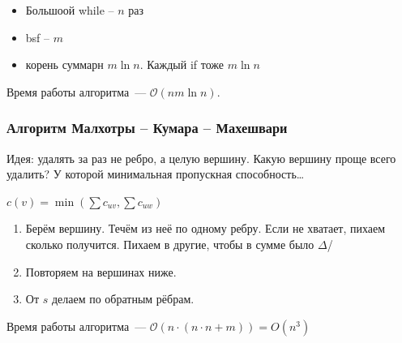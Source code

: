 \begin{itemize}
    \item Большоой while -- $n$ раз
    \item bsf -- $m$
    \item корень суммарн $m\ln n$. Каждый if тоже $m\ln n$
\end{itemize}

Время работы алгоритма~--- $\mathcal{O}\left( nm \ln n \right) $.

\subsubsection*{Алгоритм Малхотры -- Кумара -- Махешвари}

Идея: удалять за раз не ребро, а целую вершину. Какую вершину проще всего удалить? У которой минимальная пропускная способность\ldots

$c(v) = \min \left( \sum c_{uv}, \sum c_{uw} \right) $

\begin{enumerate}
    \item Берём вершину. Течём из неё по одному ребру. Если не хватает, пихаем сколько получится. Пихаем в другие, чтобы в сумме было $\Delta$/
    \item Повторяем на вершинах ниже.
    \item От $s$ делаем по обратным рёбрам.
\end{enumerate}

Время работы алгоритма~--- $\mathcal O(n\cdot (n\cdot n + m)) = O(n^3)$
\endinput